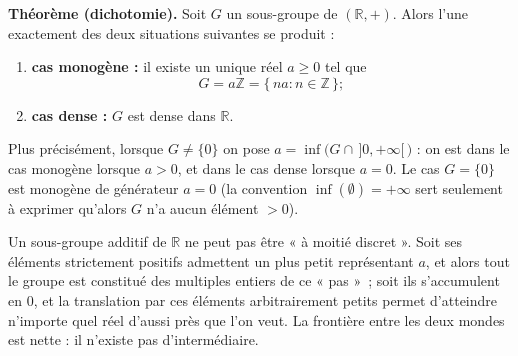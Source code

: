 


\begin{tcolorbox}[thmbox]
  \textbf{Théorème (dichotomie).}\enspace%
  Soit $G$ un sous-groupe de $(\mathbb{R},+)$. Alors l'une exactement des deux
  situations suivantes se produit :
  \begin{enumerate}
    \item \textbf{cas monogène :} il existe un unique réel $a \geq 0$ tel que
          \[
            G = a\mathbb{Z} = \{\,na : n \in \mathbb{Z}\,\} ;
          \]
    \item \textbf{cas dense :} $G$ est dense dans $\mathbb{R}$.
  \end{enumerate}
  Plus précisément, lorsque $G \neq \{0\}$ on pose
  $a = \inf\bigl(G \cap \,]0,+\infty[\,\bigr)$ : on est dans le cas monogène
  lorsque $a > 0$, et dans le cas dense lorsque $a = 0$. Le cas $G = \{0\}$ est
  monogène de générateur $a = 0$ (la convention $\inf(\emptyset) = +\infty$ sert
  seulement à exprimer qu'alors $G$ n'a aucun élément $> 0$).
\end{tcolorbox}

\begin{significationintuitive}
Un sous-groupe additif de $\mathbb{R}$ ne peut pas être « à moitié discret ».
Soit ses éléments strictement positifs admettent un plus petit représentant $a$,
et alors tout le groupe est constitué des multiples entiers de ce « pas »~; soit
ils s'accumulent en $0$, et la translation par ces éléments arbitrairement petits
permet d'atteindre n'importe quel réel d'aussi près que l'on veut. La frontière
entre les deux mondes est nette : il n'existe pas d'intermédiaire.
\end{significationintuitive}

\decsep{}


